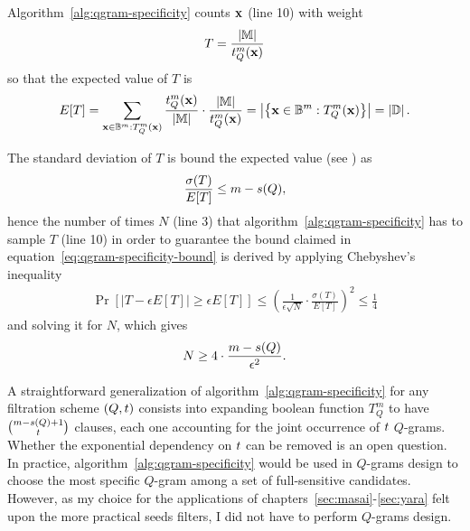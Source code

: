 Algorithm~\ref{alg:qgram-specificity} counts $\mathbf{x}$ (line 10) with weight
\begin{eqnarray}
T = \frac{\left| \mathbb{M} \right|}{t_{Q}^{m}(\mathbf{x})}
\end{eqnarray}
so that the expected value of $T$ is
\begin{eqnarray}
E[T] = \sum_{\mathbf{x} \in \mathbb {B}^{m} : T_{Q}^{m}(\mathbf{x})}{\frac{t_{Q}^{m}(\mathbf{x})}{\left| \mathbb{M} \right|} \cdot \frac{\left| \mathbb{M} \right|}{t_{Q}^{m}(\mathbf{x})}} =
\left| \left\{ \mathbf{x} \in \mathbb {B}^{m} : T_{Q}^{m}(\mathbf{x}) \right\} \right| = \left| \mathbb{D} \right|.
\end{eqnarray}

The standard deviation of $T$ is bound \wrt the expected value (see \citep[chapter 28]{Vazirani2001}) as
\begin{eqnarray}
\frac{\sigma(T)}{E[T]} \leq m - s(Q),
\end{eqnarray}
hence the number of times $N$ (line 3) that algorithm~\ref{alg:qgram-specificity} has to sample $T$ (line 10) in order to guarantee the bound claimed in equation~\ref{eq:qgram-specificity-bound} is derived by applying Chebyshev's inequality
\begin{eqnarray}
\Pr \left[ \left| T - \epsilon E[T] \right| \geq \epsilon E[T] \right] \leq \left( \frac{1}{\epsilon \sqrt{N}} \cdot \frac{\sigma(T)}{E[T]} \right)^2 \leq \frac{1}{4}
\end{eqnarray}
and solving it for $N$, which gives
\begin{eqnarray}
N \geq 4 \cdot \frac{m - s(Q)}{\epsilon^2}.
\end{eqnarray}

A straightforward generalization of algorithm~\ref{alg:qgram-specificity} for any filtration scheme $(Q,t)$ consists into expanding boolean function $T_{Q}^{m}$ to have $\binom{m-s(Q)+1}{t}$ clauses, each one accounting for the joint occurrence of $t$ $Q$-grams.
Whether the exponential dependency on $t$ can be removed is an open question.
In practice, algorithm~\ref{alg:qgram-specificity} would be used in $Q$-grams design to choose the most specific $Q$-gram among a set of full-sensitive candidates.
However, as my choice for the applications of chapters~\ref{sec:masai}-\ref{sec:yara} felt upon the more practical seeds filters, I did not have to perform $Q$-grams design.

